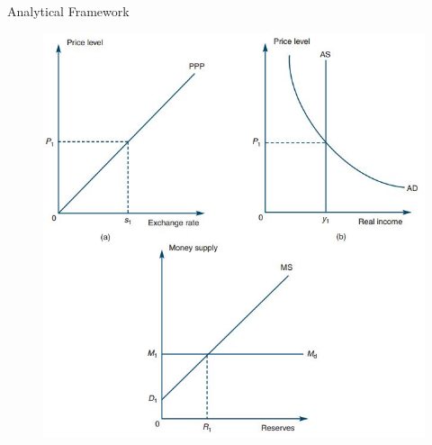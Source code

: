 \documentclass[10pt,hyperref={CJKbookmarks=true},xcolor=dvipsnames,aspectratio=169]{beamer}
\begin{document}
\begin{frame}{Analytical Framework}


\begin{figure}
\includegraphics[scale=0.5]{fig/boptheory/lec08-18.JPG}

\end{figure}

\end{frame}
\end{document}
